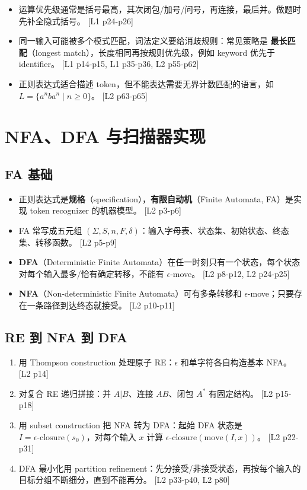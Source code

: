 \documentclass[UTF8,fontset=none,11pt]{ctexart}
\newcommand{\pg}[1]{{\scriptsize\textcolor{citegray}{[#1]}}}
\newcommand{\term}[2]{\textbf{#1}（#2）}
\begin{document}
\begin{itemize}
  \item 运算优先级通常是括号最高，其次闭包/加号/问号，再连接，最后并。做题时先补全隐式括号。 \pg{L1 p24-p26}
  \item 同一输入可能被多个模式匹配，词法定义要给消歧规则：常见策略是 \term{最长匹配}{longest match}，长度相同再按规则优先级，例如 keyword 优先于 identifier。 \pg{L1 p14-p15, L1 p35-p36, L2 p55-p62}
  \item 正则表达式适合描述 token，但不能表达需要无界计数匹配的语言，如 \(L=\{a^n b a^n\mid n\ge 0\}\)。 \pg{L2 p63-p65}
\end{itemize}

\section{NFA、DFA 与扫描器实现}

\subsection{FA 基础}

\begin{itemize}
  \item 正则表达式是\term{规格}{specification}，\term{有限自动机}{Finite Automata, FA}是实现 token recognizer 的机器模型。 \pg{L2 p3-p6}
  \item FA 常写成五元组 \((\Sigma,S,n,F,\delta)\)：输入字母表、状态集、初始状态、终态集、转移函数。 \pg{L2 p5-p9}
  \item \term{DFA}{Deterministic Finite Automata}在任一时刻只有一个状态，每个状态对每个输入最多/恰有确定转移，不能有 \(\epsilon\)-move。 \pg{L2 p8-p12, L2 p24-p25}
  \item \term{NFA}{Non-deterministic Finite Automata}可有多条转移和 \(\epsilon\)-move；只要存在一条路径到达终态就接受。 \pg{L2 p10-p11}
\end{itemize}

\subsection{RE 到 NFA 到 DFA}

\begin{enumerate}
  \item 用 Thompson construction 处理原子 RE：\(\epsilon\) 和单字符各自构造基本 NFA。 \pg{L2 p14}
  \item 对复合 RE 递归拼接：并 \(A|B\)、连接 \(AB\)、闭包 \(A^*\) 有固定结构。 \pg{L2 p15-p18}
  \item 用 subset construction 把 NFA 转为 DFA：起始 DFA 状态是 \(I=\epsilon\text{-closure}(s_0)\)，对每个输入 \(x\) 计算 \(\epsilon\text{-closure}(\text{move}(I,x))\)。 \pg{L2 p22-p31}
  \item DFA 最小化用 partition refinement：先分接受/非接受状态，再按每个输入的目标分组不断细分，直到不能再分。 \pg{L2 p33-p40, L2 p80}
\end{enumerate}
\end{document}
